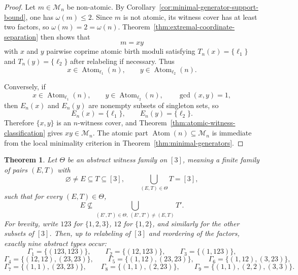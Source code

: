 \documentclass[11pt,letterpaper]{article}
\numberwithin{equation}{section}
\theoremstyle{plain}
\newtheorem{theorem}{Theorem}[section]
\theoremstyle{definition}
\theoremstyle{remark}
\DeclareMathOperator{\Atom}{Atom}
\begin{document}
\begin{proof}
Let $m\in\mathcal M_n$ be non-atomic. By
Corollary~\ref{cor:minimal-generator-support-bound}, one has $\omega(m)\le 2$.
Since $m$ is not atomic, its witness cover has at least two factors, so
$\omega(m)=2=\omega(n)$. Theorem~\ref{thm:extremal-coordinate-separation} then
shows that
\[
m=xy
\]
with $x$ and $y$ pairwise coprime atomic birth moduli satisfying
$T_n(x)=\{\ell_1\}$ and $T_n(y)=\{\ell_2\}$ after relabeling if necessary.
Thus
\[
x\in\Atom_{\ell_1}(n),
\qquad
y\in\Atom_{\ell_2}(n).
\]

Conversely, if
\[
x\in\Atom_{\ell_1}(n),
\qquad
y\in\Atom_{\ell_2}(n),
\qquad
\gcd(x,y)=1,
\]
then $E_n(x)$ and $E_n(y)$ are nonempty subsets of singleton sets, so
\[
E_n(x)=\{\ell_1\},
\qquad
E_n(y)=\{\ell_2\}.
\]
Therefore $\{x,y\}$ is an $n$-witness cover, and
Theorem~\ref{thm:atomic-witness-classification} gives $xy\in\mathcal M_n$.
The atomic part $\Atom(n)\subseteq \mathcal M_n$ is immediate from the local
minimality criterion in Theorem~\ref{thm:minimal-generators}.
\end{proof}

\begin{theorem}
\label{thm:abstract-three-coordinate-types}
Let $\Theta$ be an abstract witness family on $[3]$, meaning a finite family
of pairs $(E,T)$ with
\[
\varnothing\neq E\subseteq T\subseteq [3],
\qquad
\bigcup_{(E,T)\in\Theta}T=[3],
\]
such that for every $(E,T)\in\Theta$,
\[
E\not\subseteq
\bigcup_{(E',T')\in\Theta,\ (E',T')\neq (E,T)} T'.
\]
For brevity, write $123$ for $\{1,2,3\}$, $12$ for $\{1,2\}$, and similarly
for the other subsets of $[3]$. Then, up to relabeling of $[3]$ and
reordering of the factors, exactly nine abstract types occur:
\[
\Gamma_1=\{(123,123)\},
\qquad
\Gamma_2=\{(12,123)\},
\qquad
\Gamma_3=\{(1,123)\},
\]
\[
\Gamma_4=\{(12,12),(23,23)\},
\qquad
\Gamma_5=\{(1,12),(23,23)\},
\qquad
\Gamma_6=\{(1,12),(3,23)\},
\]
\[
\Gamma_7=\{(1,1),(23,23)\},
\qquad
\Gamma_8=\{(1,1),(2,23)\},
\qquad
\Gamma_9=\{(1,1),(2,2),(3,3)\}.
\]
\end{theorem}
\end{document}
